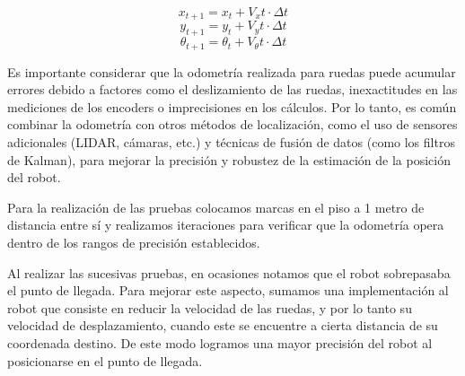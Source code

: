 $$ x_{t+1} = x_t + V_xt \cdot \Delta t $$
$$ y_{t+1} = y_t + V_yt \cdot \Delta t $$
$$ \theta_{t+1} = \theta_t + V_\theta t \cdot \Delta t $$

Es importante considerar que la odometría realizada para ruedas puede acumular errores debido a factores como el deslizamiento de las ruedas, inexactitudes en las mediciones de los encoders o imprecisiones en los cálculos. Por lo tanto, es común combinar la odometría con otros métodos de localización, como el uso de sensores adicionales (LIDAR, cámaras, etc.) y técnicas de fusión de datos (como los filtros de Kalman), para mejorar la precisión y robustez de la estimación de la posición del robot.

Para la realización de las pruebas colocamos marcas en el piso a 1 metro de distancia entre sí y realizamos iteraciones para verificar que la odometría opera dentro de los rangos de precisión establecidos.

Al realizar las sucesivas pruebas, en ocasiones notamos que el robot sobrepasaba el punto de llegada. Para mejorar este aspecto, sumamos una implementación al robot que consiste en reducir la velocidad de las ruedas, y por lo tanto su velocidad de desplazamiento, cuando este se encuentre a cierta distancia de su coordenada destino. De este modo logramos una mayor precisión del robot al posicionarse en el punto de llegada.
